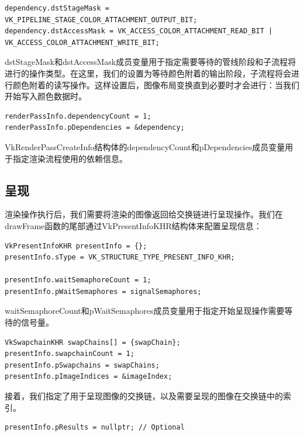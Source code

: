 \documentclass{ctexart}
\begin{document}
\begin{lstlisting}[language={[ANSI]C}]
dependency.dstStageMask = VK_PIPELINE_STAGE_COLOR_ATTACHMENT_OUTPUT_BIT;
dependency.dstAccessMask = VK_ACCESS_COLOR_ATTACHMENT_READ_BIT | VK_ACCESS_COLOR_ATTACHMENT_WRITE_BIT;
\end{lstlisting}

dstStageMask和dstAccessMask成员变量用于指定需要等待的管线阶段和子流程将进行的操作类型。在这里，我们的设置为等待颜色附着的输出阶段，子流程将会进行颜色附着的读写操作。这样设置后，图像布局变换直到必要时才会进行：当我们开始写入颜色数据时。

\begin{lstlisting}[language={[ANSI]C}]
renderPassInfo.dependencyCount = 1;
renderPassInfo.pDependencies = &dependency;
\end{lstlisting}

VkRenderPassCreateInfo结构体的dependencyCount和pDependencies成员变量用于指定渲染流程使用的依赖信息。

\subsection{呈现}

渲染操作执行后，我们需要将渲染的图像返回给交换链进行呈现操作。我们在drawFrame函数的尾部通过VkPresentInfoKHR结构体来配置呈现信息：

\begin{lstlisting}[language={[ANSI]C}]
VkPresentInfoKHR presentInfo = {};
presentInfo.sType = VK_STRUCTURE_TYPE_PRESENT_INFO_KHR;

presentInfo.waitSemaphoreCount = 1;
presentInfo.pWaitSemaphores = signalSemaphores;
\end{lstlisting}

waitSemaphoreCount和pWaitSemaphores成员变量用于指定开始呈现操作需要等待的信号量。

\begin{lstlisting}[language={[ANSI]C}]
VkSwapchainKHR swapChains[] = {swapChain};
presentInfo.swapchainCount = 1;
presentInfo.pSwapchains = swapChains;
presentInfo.pImageIndices = &imageIndex;
\end{lstlisting}

接着，我们指定了用于呈现图像的交换链，以及需要呈现的图像在交换链中的索引。

\begin{lstlisting}[language={[ANSI]C}]
presentInfo.pResults = nullptr; // Optional
\end{lstlisting}
\end{document}

